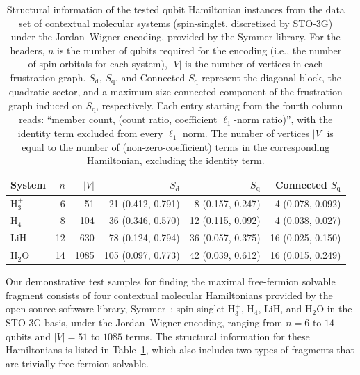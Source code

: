 \documentclass[%
 aip,
 amsmath,amssymb,
 reprint,%
]{revtex4-1}
\newcommand{\pool}{S}                    %
\newcommand{\subdiag}{\mathrm{d}}        %
\newcommand{\subquad}{\mathrm{q}}        %
\newcommand{\pooldiag}{\pool_{\subdiag}} %
\newcommand{\poolquad}{\pool_{\subquad}} %
\begin{document}
\begin{table}[htbp]
\centering
\renewcommand{\arraystretch}{1.1}
\setlength{\tabcolsep}{4pt}
\begin{tabular}{l r r r r r}
\toprule
System & $n$ & $|V|$ & $\pooldiag$ & $\poolquad$ & Connected $\poolquad$ \\
\midrule
$\mathrm{H_3^{+}}$ &  6 &   51 &  21 (0.412, 0.791) &  8 (0.157, 0.247) &  4 (0.078, 0.092) \\
$\mathrm{H_4}$     &  8 &  104 &  36 (0.346, 0.570) & 12 (0.115, 0.092) &  4 (0.038, 0.027) \\
$\mathrm{LiH}$     & 12 &  630 &  78 (0.124, 0.794) & 36 (0.057, 0.375) & 16 (0.025, 0.150) \\
$\mathrm{H_2O}$    & 14 & 1085 & 105 (0.097, 0.773) & 42 (0.039, 0.612) & 16 (0.015, 0.249) \\
\bottomrule
\end{tabular}
\caption{
Structural information of the tested qubit Hamiltonian instances from the data set of contextual molecular systems (spin-singlet, discretized by STO-3G) under the Jordan--Wigner encoding, provided by the Symmer library. For the headers, $n$ is the number of qubits required for the encoding (i.e., the number of spin orbitals for each system), $|V|$ is the number of vertices in each frustration graph. $\pooldiag$, $\poolquad$, and Connected $\poolquad$ represent the diagonal block, the quadratic sector, and a maximum-size connected component of the frustration
graph induced on $\poolquad$, respectively.  Each entry starting from the fourth column reads: ``member count, (count ratio, coefficient $\ell_1$-norm ratio)'', with the identity term excluded from every $\ell_1$ norm. The number of vertices $|V|$ is equal to the number of (non-zero-coefficient) terms in the corresponding Hamiltonian, excluding the identity term. }
\label{tab:sys-db-1body}
\end{table}

Our demonstrative test samples for finding the maximal free-fermion solvable fragment consists of four contextual molecular Hamiltonians provided by the open-source software library, Symmer~\cite{githubSymmertestshamiltonian_dataMain}: spin-singlet H$_3^+$, H$_4$, LiH, and H$_2$O in the STO-3G basis, under the Jordan--Wigner encoding, ranging from $n\!=\!6$ to $14$ qubits and $|V|=51$ to $1085$ terms. The structural information for these Hamiltonians is listed in Table~\ref{tab:sys-db-1body}, which also includes two types of fragments that are trivially free-fermion solvable. 
\end{document}
